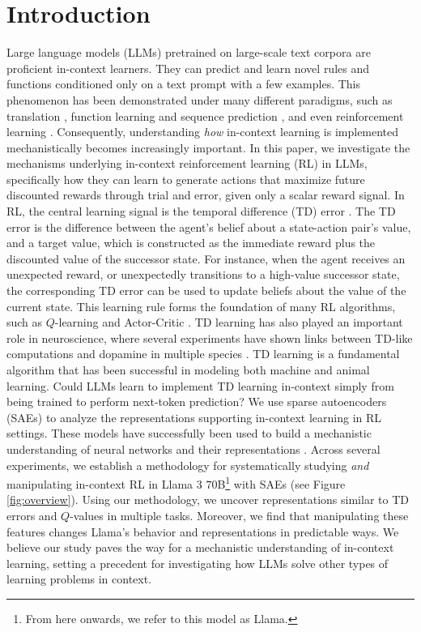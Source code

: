 \documentclass{article}
\begin{document}
\section{Introduction}
Large language models (LLMs) pretrained on large-scale text corpora are proficient in-context learners. They can predict and learn novel rules and functions conditioned only on a text prompt with a few examples. This phenomenon has been demonstrated under many different paradigms, such as translation \citep{brown2020language, wei_emergent_2022}, function learning and sequence prediction \citep{garg2022can, coda2023meta}, and even reinforcement learning \citep{binz_using_2023, shinn2024reflexion, brooks2022context, schubert2024context, hayes2024large}. Consequently, understanding \emph{how} in-context learning is implemented mechanistically becomes increasingly important. In this paper, we investigate the mechanisms underlying in-context reinforcement learning (RL) in LLMs, specifically how they can learn to generate actions that maximize future discounted rewards through trial and error, given only a scalar reward signal.
In RL, the central learning signal is the temporal difference (TD) error \citep{sutton1988learning}. The TD error is the difference between the agent's belief about a state-action pair's value, and a target value, which is constructed as the immediate reward plus the discounted value of the successor state. For instance, when the agent receives an unexpected reward, or unexpectedly transitions to a high-value successor state, the corresponding TD error can be used to update beliefs about the value of the current state. This learning rule forms the foundation of many RL algorithms, such as $Q$-learning \citep{mnih2015human, watkins1992q} and Actor-Critic \citep{konda1999actor, sutton1999policy, haarnoja2018soft}. TD learning has also played an important role in neuroscience, where several experiments have shown links between TD-like computations and dopamine in multiple species \citep{montague1996framework, schultz_neural_1997, fiorillo2003discrete, flagel2011selective, niv2015reinforcement}.
TD learning is a fundamental algorithm that has been successful in modeling both machine and animal learning. Could LLMs learn to implement TD learning in-context simply from being trained to perform next-token prediction? We use sparse autoencoders (SAEs) to analyze the representations supporting in-context learning in RL settings. These models have successfully been used to build a mechanistic understanding of neural networks and their representations \citep{bricken_towards_2023, templeton2024scaling, gao2024scaling, lieberum2024gemma}. Across several experiments, we establish a methodology for systematically studying \emph{and} manipulating in-context RL in Llama $3$ $70$B\footnote{From here onwards, we refer to this model as Llama.} \citep{dubey2024llama} with SAEs (see Figure \ref{fig:overview}). Using our methodology, we uncover representations similar to TD errors and $Q$-values in multiple tasks. Moreover, we find that manipulating these features changes Llama's behavior and representations in predictable ways. We believe our study paves the way for a mechanistic understanding of in-context learning, setting a precedent for investigating how LLMs solve other types of learning problems in context.
\end{document}
